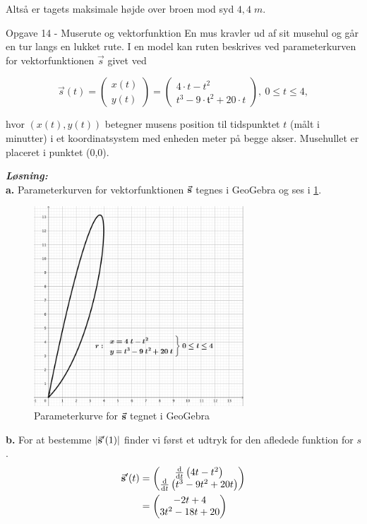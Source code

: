 \documentclass{article}
\newcommand{\sol}{\setlength{\parindent}{0cm}\textbf{\textit{Løsning:}}\setlength{\parindent}{1cm}}
\begin{document}
Altså er tagets maksimale højde over broen mod syd $4,4 \;\unit{m} $.
\begin{question}{Opgave 14 - Muserute og vektorfunktion}{}
  En mus kravler ud af sit musehul og går en tur langs en lukket rute. I en model kan ruten
beskrives ved parameterkurven for vektorfunktionen $\vec{s}$ givet ved

$$\vec{s}(t)=\begin{pmatrix}x(t)\\y(t)\end{pmatrix}=\begin{pmatrix}4\cdot t-t^2\\t^3-9\cdot\mathfrak{t}^2+20\cdot t\end{pmatrix},\:0\le t\le4,$$

hvor $(x(t),y(t))$ betegner musens position til tidspunktet $t$ (målt i minutter) i et
koordinatsystem med enheden meter på begge akser. Musehullet er placeret i punktet
(0,0).
\end{question}
\sol \\
\textbf{a.}
Parameterkurven for vektorfunktionen $\va{s} $ tegnes i GeoGebra og ses i \cref{fig:rute}. 
\begin{figure}[H]
\begin{center}
  \includegraphics[width=0.7\textwidth]{rute.png}
\end{center}
\caption{Parameterkurve for $\va{s} $ tegnet i GeoGebra }
\label{fig:rute}
\end{figure}
\noindent \textbf{b.}
For at bestemme $\abs{\va{s}'(1)} $ finder vi først et udtryk for den afledede funktion for $s$. 
\begin{equation*}
\begin{split}
  \va{s}'(t)&=\mqty(\dv{t} \left(4t-t^2\right) \\ \dv{t} \left(t^3-9t^2+20t\right) ) \\
  &=\mqty(-2t+4\\ 3t^2-18t+20) 
\end{split}
\end{equation*}
\end{document}
